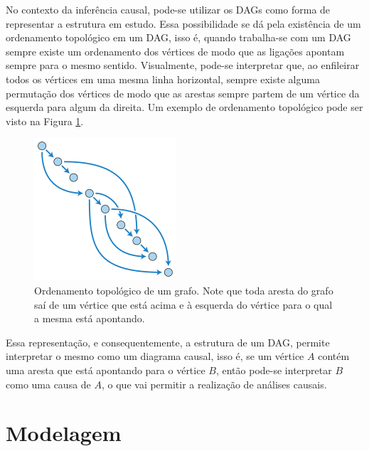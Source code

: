 \documentclass[11pt,letterpaper,twocolumn]{article}
\begin{document}
No contexto da inferência causal, pode-se utilizar os DAGs como forma de representar a estrutura em estudo. Essa possibilidade se dá pela existência de um ordenamento topológico em um DAG, isso é, quando trabalha-se com um DAG sempre existe um ordenamento dos vértices de modo que as ligações apontam sempre para o mesmo sentido. Visualmente, pode-se interpretar que, ao enfileirar todos os vértices em uma mesma linha horizontal, sempre existe alguma permutação dos vértices de modo que as arestas sempre partem de um vértice da esquerda para algum da direita. Um exemplo de ordenamento topológico pode ser visto na Figura \ref{ord_top}.
\begin{figure}
    \centering
    \includegraphics{A2/Imagens/Topological_Ordering.png}
    \caption{Ordenamento topológico de um grafo. Note que toda aresta do grafo saí de um vértice que está acima e à esquerda do vértice para o qual a mesma está apontando.}
    \label{ord_top}
\end{figure}

Essa representação, e consequentemente, a estrutura de um DAG, permite interpretar o mesmo como um diagrama causal, isso é, se um vértice $A$ contém uma aresta que está apontando para o vértice $B$, então pode-se interpretar $B$ como uma causa de $A$, o que vai permitir a realização de análises causais.

\section{Modelagem}
\justify
\end{document}
